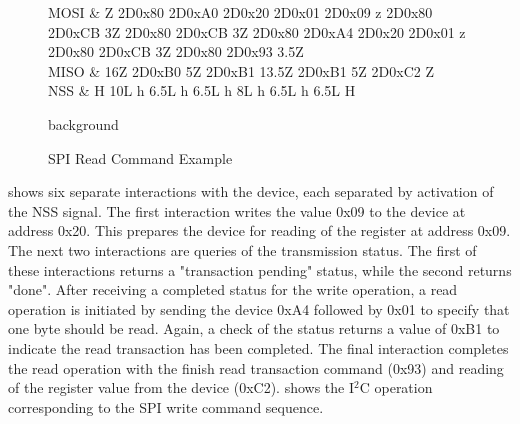 \begin{figure*}
\centering
	\begin{tikztimingtable}[
		xscale=1.2,
		yscale=1.5,
		timing/name/.style={font=\normalfont},
		timing/table/header/.style={font=\normalfont},
		timing/x/.style={black},
		timing/z/.style={black},
		timing/slope=0.2,
		timing/c/no arrows,
		timing/c/arrow tip=stealth,
		timing/c/arrow pos=0.75,
	    	]
    	MOSI 		& Z 2D{0x80} 2D{0xA0} 2D{0x20} 2D{0x01} 2D{0x09} z 2D{0x80} 2D{0xCB} 3Z 2D{0x80} 2D{0xCB} 3Z 2D{0x80} 2D{0xA4} 2D{0x20} 2D{0x01} z 2D{0x80} 2D{0xCB} 3Z 2D{0x80} 2D{0x93} 3.5Z \\
	MISO		& 16Z 2D{0xB0} 5Z 2D{0xB1} 13.5Z 2D{0xB1} 5Z 2D{0xC2} Z\\
	NSS		& H 10L h 6.5L h 6.5L h 8L h 6.5L h 6.5L H\\
    	\extracode
	\begin{pgfonlayer}{background}
    	\end{pgfonlayer}
    \end{tikztimingtable}
    \caption{SPI Read Command Example}
    \label{fig:spireadexample}
\end{figure*}


 shows six separate interactions with the device, each separated by activation of the NSS signal. The first interaction writes the value 0x09 to the device at address 0x20. This prepares the device for reading of the register at address 0x09. The next two interactions are queries of the transmission status. The first of these interactions returns a "transaction pending" status, while the second returns "done". After receiving a completed status for the write operation, a read operation is initiated by sending the device 0xA4 followed by 0x01 to specify that one byte should be read. Again, a check of the status returns a value of 0xB1 to indicate the read transaction has been completed. The final interaction completes the read operation with the finish read transaction command (0x93) and reading of the register value from the device (0xC2).  shows the I$^2$C operation corresponding to the SPI write command sequence.


